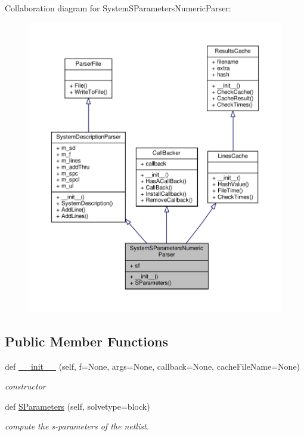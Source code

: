 Collaboration diagram for System\+S\+Parameters\+Numeric\+Parser\+:
\nopagebreak
\begin{figure}[H]
\begin{center}
\leavevmode
\includegraphics[width=350pt]{classSignalIntegrity_1_1Parsers_1_1SystemSParametersParser_1_1SystemSParametersNumericParser__coll__graph}
\end{center}
\end{figure}
\subsection*{Public Member Functions}
\begin{DoxyCompactItemize}
\item 
def \hyperlink{classSignalIntegrity_1_1Parsers_1_1SystemSParametersParser_1_1SystemSParametersNumericParser_a5ce77900c33ce9b681aebb5c527ab92a}{\+\_\+\+\_\+init\+\_\+\+\_\+} (self, f=None, args=None, callback=None, cache\+File\+Name=None)
\begin{DoxyCompactList}\small\item\em constructor \end{DoxyCompactList}\item 
def \hyperlink{classSignalIntegrity_1_1Parsers_1_1SystemSParametersParser_1_1SystemSParametersNumericParser_a8d7c0357cfcdfd41f8cca9627ff9a61f}{S\+Parameters} (self, solvetype=\textquotesingle{}block\textquotesingle{})
\begin{DoxyCompactList}\small\item\em compute the s-\/parameters of the netlist. \end{DoxyCompactList}\end{DoxyCompactItemize}


